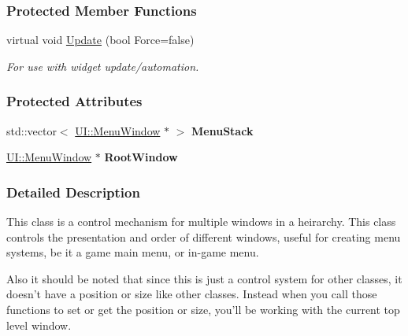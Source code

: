 \subsubsection*{Protected Member Functions}
\begin{DoxyCompactItemize}
\item 
\hypertarget{classphys_1_1UI_1_1Menu_a8759b8656fdbbc0e1231a3f8d2ad4835}{
virtual void \hyperlink{classphys_1_1UI_1_1Menu_a8759b8656fdbbc0e1231a3f8d2ad4835}{Update} (bool Force=false)}
\label{classphys_1_1UI_1_1Menu_a8759b8656fdbbc0e1231a3f8d2ad4835}

\begin{DoxyCompactList}\small\item\em For use with widget update/automation. \item\end{DoxyCompactList}\end{DoxyCompactItemize}
\subsubsection*{Protected Attributes}
\begin{DoxyCompactItemize}
\item 
\hypertarget{classphys_1_1UI_1_1Menu_a79081cb1d293f75fc69f20ed7e91dff6}{
std::vector$<$ \hyperlink{classphys_1_1UI_1_1MenuWindow}{UI::MenuWindow} $\ast$ $>$ {\bfseries MenuStack}}
\label{classphys_1_1UI_1_1Menu_a79081cb1d293f75fc69f20ed7e91dff6}

\item 
\hypertarget{classphys_1_1UI_1_1Menu_a02ca1c85ecb8cacf57c7fdad8ea16385}{
\hyperlink{classphys_1_1UI_1_1MenuWindow}{UI::MenuWindow} $\ast$ {\bfseries RootWindow}}
\label{classphys_1_1UI_1_1Menu_a02ca1c85ecb8cacf57c7fdad8ea16385}

\end{DoxyCompactItemize}


\subsubsection{Detailed Description}
This class is a control mechanism for multiple windows in a heirarchy. This class controls the presentation and order of different windows, useful for creating menu systems, be it a game main menu, or in-\/game menu. \par
 \par
 Also it should be noted that since this is just a control system for other classes, it doesn't have a position or size like other classes. Instead when you call those functions to set or get the position or size, you'll be working with the current top level window. 

